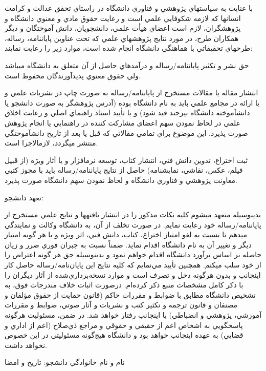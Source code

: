 \noindent با عنايت به سياستهاي پژوهشي و فناوري دانشگاه در راستاي تحقق عدالت و کرامت انسانها که لازمه شکوفايي علمي است و رعايت حقوق مادي و معنوي دانشگاه و پژوهشگران، لازم است اعضاي هيأت علمي، دانشجويان، دانش آموختگان و ديگر همکاران طرح، در مورد نتايج پژوهشهاي علمي که تحت عناوين پاياننامه، رساله، طرحهاي تحقيقاتي با هماهنگي دانشگاه انجام شده است، موارد زير را رعايت نمايند:\par حق نشر و تکثير پاياننامه/رساله و درآمدهاي حاصل از آن متعلق به دانشگاه ميباشد ولي حقوق معنوي پديدآورندگان محفوظ است.\par انتشار مقاله يا مقالات مستخرج از پاياننامه/رساله به صورت چاپ در نشريات علمي و يا ارائه در مجامع علمي بايد به نام دانشگاه بوده (آدرس پژوهشگر به صورت دانشجو يا دانشآموخته دانشگاه بيرجند قيد شود) و با تأييد استاد راهنماي اصلي و رعايت اخلاق علمي در لحاظ نمودن سهم اعضاي مشارکت کننده در راهنمايي يا انجام پژوهش صورت پذيرد. اين موضوع براي تمامي مقالاتي که قبل يا بعد از تاريخ دانشآموختگي منتشر ميگردد، لازمالاجرا است.\par ثبت اختراع، تدوين دانش فني، انتشار کتاب، توسعه نرمافزار و يا آثار ويژه (از قبيل فيلم، عکس، نقاشي، نمايشنامه) حاصل از نتايج پاياننامه/رساله بايد با مجوز کتبي معاونت پژوهشي و فناوري دانشگاه و لحاظ نمودن سهم دانشگاه صورت پذيرد.\par\smallskip
\noindent تعهد دانشجو:\par بدينوسيله متعهد ميشوم کليه نکات مذکور را در انتشار يافتهها و نتايج علمي مستخرج از پاياننامه/رساله خود رعايت نمايم. در صورت تخلف از آن، به دانشگاه وکالت و نمايندگي ميدهم تا نسبت به لغو امتياز اختراع، کتاب، دانش فني، اثر ويژه و يا هر گونه امتياز ديگر و تغيير آن به نام دانشگاه اقدام نمايد. ضمناً نسبت به جبران فوري ضرر و زيان حاصله بر اساس برآورد دانشگاه اقدام خواهم نمود و بدينوسيله حق هر گونه اعتراض را از خود سلب ميکنم. همچنين تأييد مي‌نمايم كه كليه‌ نتايج اين پايان‌نامه/رساله حاصل كار اينجانب و بدون هرگونه دخل و تصرف است و موارد نسخه‌برداري‌شده از آثار ديگران را با ذكر كامل مشخصات منبع ذكر كرده‌ام. درصورت اثبات خلاف مندرجات فوق، به تشخيص دانشگاه مطابق با ضوابط و مقررات حاكم (قانون حمايت از حقوق مؤلفان و مصنفان و قانون ترجمه و تكثير كتب و نشريات و آثار صوتي، ضوابط و مقررات آموزشي، پژوهشي و انضباطي) با اينجانب رفتار خواهد شد. در ضمن، مسئوليت هرگونه پاسخگويي به اشخاص اعم از حقيقي و حقوقي و مراجع ذي‌صلاح (اعم از اداري و قضايي) به عهده‌ اينجانب خواهد بود و دانشگاه هيچ‌گونه مسئوليتي در اين خصوص نخواهد داشت.\par نام و نام خانوادگي دانشجو:                                                          تاريخ و امضا\par\smallskip
